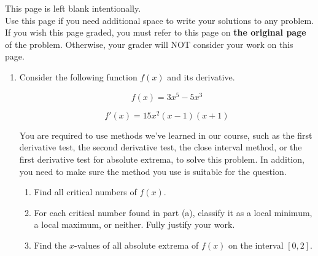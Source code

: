 \documentclass[11pt]{article}
\begin{document}
{    }

\vfill


\newpage

This page is left blank intentionally.\\

Use this page if you need additional space to write your solutions to any problem. \\

If you wish this page graded, you must refer to this page on \textbf{the original page} of the problem. Otherwise, your grader will NOT consider your work on this page.

\newpage%


\begin{enumerate}


\item Consider the following function $f(x)$ and its derivative.

\[f(x)=3x^5-5x^3\]%

\[f'(x)=15x^2(x-1)(x+1)\]%

You are required to use methods we've learned in our course, such as the first derivative test, the second derivative test, the close interval method, or the first derivative test for absolute extrema, to solve this problem. In addition, you need to make sure the method you use is suitable for the question.

\begin{enumerate}
    \item Find all critical numbers of $f(x)$.

    \vfill

    \item For each critical number found in part (a), classify it as a local minimum, a local maximum, or neither. Fully justify your work.

    \vfill
    \vfill
    \vfill

    \item Find the $x$-values of all absolute extrema of $f(x)$ on the interval $[0, 2]$.

    \vfill
    \vfill
    \vfill
\end{enumerate}



\end{enumerate}
\end{document}
